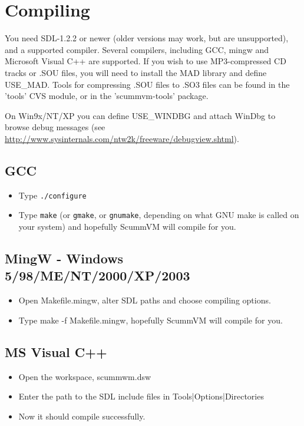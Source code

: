 

\section{Compiling}

You need SDL-1.2.2 or newer (older versions may work, but are unsupported), and
a supported compiler. Several compilers, including GCC, mingw and Microsoft
Visual C++ are supported. If you wish to use MP3-compressed CD tracks or
.SOU files, you will need to install the MAD library and define
USE\_MAD. Tools for compressing .SOU files to .SO3 files can be
found in the 'tools' CVS module, or in the 'scummvm-tools' package.

On Win9x/NT/XP you can define USE\_WINDBG and attach WinDbg to browse debug 
messages (see \url{http://www.sysinternals.com/ntw2k/freeware/debugview.shtml}).

\subsection{GCC}
  \begin{itemize}
  \item Type \texttt{./configure}
  \item Type \texttt{make} (or \texttt{gmake}, or \texttt{gnumake}, depending
        on what GNU make is called on your system) and hopefully ScummVM will
        compile for you.
  \end{itemize}
\subsection{MingW -  Windows 5/98/ME/NT/2000/XP/2003}
  \begin{itemize}
  \item Open Makefile.mingw, alter SDL paths and choose compiling
    options.
  \item Type make -f Makefile.mingw,  hopefully ScummVM will compile for you.
  \end{itemize}
\subsection{MS Visual C++}
  \begin{itemize}
  \item Open the workspace, scummwm.dsw
  \item Enter the path to the SDL include files in
    Tools|Options|Directories
  \item Now it should compile successfully. 
  \end{itemize}
